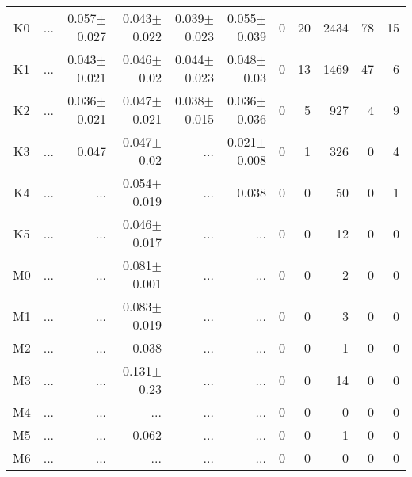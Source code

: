 \begin{table}[t]
\begin{center}
\begin{tabular}{c|rrrrr|rrrrr}
K0	&	 ...	&	0.057$\pm$0.027	&	0.043$\pm$0.022	&	0.039$\pm$0.023	&	0.055$\pm$0.039	&	0	&	20	&	2434	&	78	&	15	\\
K1	&	 ...	&	0.043$\pm$0.021	&	0.046$\pm$0.02	&	0.044$\pm$0.023	&	0.048$\pm$0.03	&	0	&	13	&	1469	&	47	&	6	\\
K2	&	 ...	&	0.036$\pm$0.021	&	0.047$\pm$0.021	&	0.038$\pm$0.015	&	0.036$\pm$0.036	&	0	&	5	&	927	&	4	&	9	\\
K3	&	 ...	&	0.047	&	0.047$\pm$0.02	&	 ...	&	0.021$\pm$0.008	&	0	&	1	&	326	&	0	&	4	\\
K4	&	 ...	&	 ...	&	0.054$\pm$0.019	&	 ...	&	0.038	&	0	&	0	&	50	&	0	&	1	\\
K5	&	 ...	&	 ...	&	0.046$\pm$0.017	&	 ...	&	 ...	&	0	&	0	&	12	&	0	&	0	\\
M0	&	 ...	&	 ...	&	0.081$\pm$0.001	&	 ...	&	 ...	&	0	&	0	&	2	&	0	&	0	\\
M1	&	 ...	&	 ...	&	0.083$\pm$0.019	&	 ...	&	 ...	&	0	&	0	&	3	&	0	&	0	\\
M2	&	 ...	&	 ...	&	0.038	&	 ...	&	 ...	&	0	&	0	&	1	&	0	&	0	\\
M3	&	 ...	&	 ...	&	0.131$\pm$0.23	&	 ...	&	 ...	&	0	&	0	&	14	&	0	&	0	\\
M4	&	 ...	&	 ...	&	 ...	&	 ...	&	 ...	&	0	&	0	&	0	&	0	&	0	\\
M5	&	 ...	&	 ...	&	-0.062	&	 ...	&	 ...	&	0	&	0	&	1	&	0	&	0	\\
M6	&	 ...	&	 ...	&	 ...	&	 ...	&	 ...	&	0	&	0	&	0	&	0	&	0	\\
    \bottomrule
    \end{tabular}
\end{center}
\end{table}

